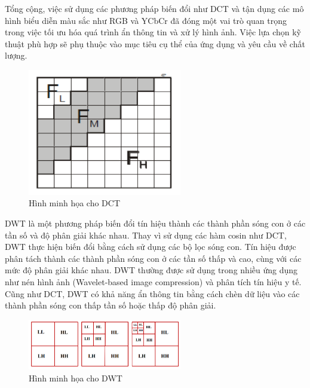 Tổng cộng, việc sử dụng các phương pháp biến đổi như DCT và tận dụng các mô hình biểu diễn màu sắc như RGB và YCbCr đã đóng một vai trò quan trọng trong việc tối ưu hóa quá trình ẩn thông tin và xử lý hình ảnh. Việc lựa chọn kỹ thuật phù hợp sẽ phụ thuộc vào mục tiêu cụ thể của ứng dụng và yêu cầu về chất lượng.


\begin{figure}[!h]
    \centering
    \includegraphics[width=0.6\textwidth]{graphics/chapter-3/DCT_algo1.PNG}
    \caption{Hình minh họa cho DCT}
    \label{fig:PNG}
\end{figure}

DWT là một phương pháp biến đổi tín hiệu thành các thành phần sóng con ở các tần số và độ phân giải khác nhau. Thay vì sử dụng các hàm cosin như DCT, DWT thực hiện biến đổi bằng cách sử dụng các bộ lọc sóng con. Tín hiệu được phân tách thành các thành phần sóng con ở các tần số thấp và cao, cùng với các mức độ phân giải khác nhau. DWT thường được sử dụng trong nhiều ứng dụng như nén hình ảnh (Wavelet-based image compression) và phân tích tín hiệu y tế. Cũng như DCT, DWT có khả năng ẩn thông tin bằng cách chèn dữ liệu vào các thành phần sóng con thấp tần số hoặc thấp độ phân giải.

\begin{figure}[!h]
    \centering
    \includegraphics[width=0.6\textwidth]{graphics/chapter-3/DWT.PNG}
    \caption{Hình minh họa cho DWT}
    \label{fig:PNG}
\end{figure}


